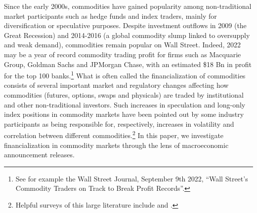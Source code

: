 \documentclass[12pt]{article}
\begin{document}


Since the early 2000s, commodities have gained popularity among non-traditional market participants such as hedge funds and index traders, mainly for diversification or speculative purposes. Despite investment outflows in 2009 (the Great Recession) and 2014-2016 (a global commodity slump linked to oversupply and weak demand), commodities remain popular on Wall Street. Indeed, 2022 may be a year of record commodity trading profit for firms such as Macquarie Group, Goldman Sachs and JPMorgan Chase, with an estimated \$18 Bn in profit for the top 100 banks.\footnote{See for example the Wall Street Journal, September 9th 2022, ``Wall Street’s Commodity Traders on Track to Break Profit Records''.} What is often called the financialization of commodities consists of several important market and regulatory changes affecting how commodities (futures, options, swaps and physicals) are traded by institutional and other non-traditional investors. Such increases in speculation and long-only index positions in commodity markets have been pointed out by some industry participants as being responsible for, respectively, increases in volatility and correlation between different commodities.\footnote{Helpful surveys of this large literature include \citet{boyd2018update} and \citet{cheng2014financialization}.} In this paper, we investigate financialization in commodity markets through the lens of macroeconomic announcement releases.
\end{document}

